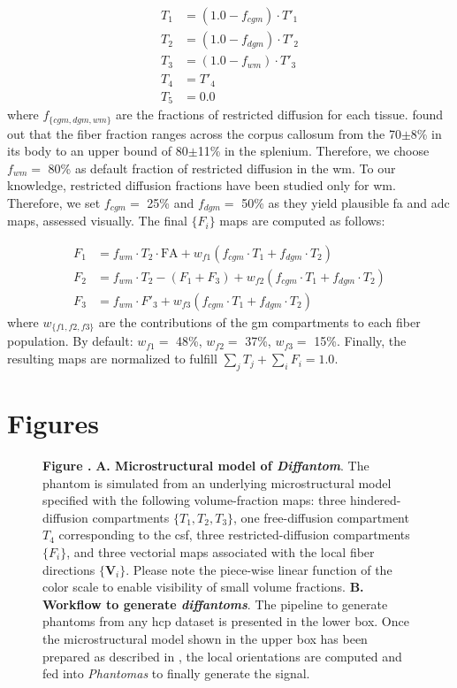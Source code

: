 \documentclass[english]{frontiers/frontiersSCNS} %
\begin{document}
  \begin{align*}
  T_1 &= (1.0-f_{cgm}) \cdot T'_1 \\
  T_2 &= (1.0-f_{dgm}) \cdot T'_2 \\
  T_3 &= (1.0-f_{wm}) \cdot T'_3 \\
  T_4 &= T'_4 \\
  T_5 &= 0.0
  \end{align*}
where $f_{\{cgm, dgm, wm\}}$ are the fractions of restricted diffusion for each tissue.
\cite{sepehrband_brain_2015} found out that the fiber fraction ranges across the corpus
  callosum from the 70$\pm$8\% in its body to an upper bound of 80$\pm$11\% in the splenium.
Therefore, we choose $f_{wm} =$ 80\% as default fraction of restricted diffusion in the
  \gls*{wm}.
To our knowledge, restricted diffusion fractions have been studied only for \gls*{wm}.
Therefore, we set $f_{cgm} =$ 25\% and $f_{dgm} =$ 50\% as they yield plausible \gls*{fa}
  and \gls*{adc} maps, assessed visually.
The final $\{F_i\}$ maps are computed as follows:

\begin{align*}
F_1 &= f_{wm} \cdot T_2 \cdot \text{FA} + w_{f1} (f_{cgm} \cdot T_1 + f_{dgm} \cdot T_2) \\
F_2 &= f_{wm} \cdot T_2 - (F_1 + F_3) + w_{f2} (f_{cgm} \cdot T_1 + f_{dgm} \cdot T_2) \\
F_3 &= f_{wm} \cdot F'_3 + w_{f3} (f_{cgm} \cdot T_1 + f_{dgm} \cdot T_2)
\end{align*}
where $w_{\{f1, f2, f3\}}$ are the contributions of the \gls*{gm} compartments to each fiber population.
By default: $w_{f1} = $ 48\%, $w_{f2} = $ 37\%, $w_{f3} = $ 15\%.
Finally, the resulting maps are normalized to fulfill $\sum_j T_j + \sum_i F_i = 1.0$.

\newpage
\section*{Figures}

\begin{figure}[h!]
\begin{center}

\end{center}
\textbf{\label{fig:figure1} Figure . }{%
\textbf{A. Microstructural model of \emph{Diffantom}}.
The phantom is simulated from an underlying microstructural model specified with the
  following volume-fraction maps: three hindered-diffusion compartments $\{T_1, T_2, T_3\}$,
  one free-diffusion compartment $T_4$ corresponding to the \gls*{csf},
  three restricted-diffusion compartments $\{F_i\}$, and three vectorial maps
  associated with the local fiber directions $\{\mathbf{V}_i\}$.
Please note the piece-wise linear function of the color scale to enable visibility of small volume fractions.
\textbf{B. Workflow to generate \emph{diffantoms}}.
The pipeline to generate phantoms from any \gls*{hcp} dataset is presented in the lower box.
Once the microstructural model shown in the upper box has been prepared as described in ,
  the local orientations are computed and fed into \emph{Phantomas} to finally generate the signal.
}
\end{figure}
\end{document}
